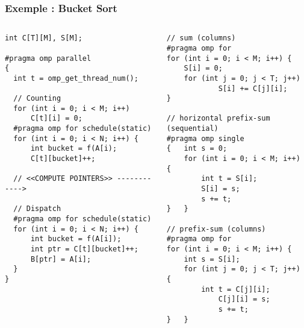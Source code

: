 \documentclass[xcolor={x11names,svgnames},x11names,svgnames]{beamer}
\begin{document}
\begin{frame}[label=radix_noconflict_table]
  \end{frame}


\begin{frame}[label=radix_code, fragile]
  \frametitle{Exemple : Bucket Sort}

  \begin{columns}
    \begin{column}{0.5\textwidth}
\begin{verbatim}
int C[T][M], S[M];

#pragma omp parallel
{
  int t = omp_get_thread_num();

  // Counting
  for (int i = 0; i < M; i++)
      C[t][i] = 0;
  #pragma omp for schedule(static)
  for (int i = 0; i < N; i++) {
      int bucket = f(A[i);
      C[t][bucket]++;

  // <<COMPUTE POINTERS>> ------------>

  // Dispatch
  #pragma omp for schedule(static)
  for (int i = 0; i < N; i++) {
      int bucket = f(A[i]);
      int ptr = C[t][bucket]++;
      B[ptr] = A[i];
  }
}
\end{verbatim}
    \end{column}  

    \begin{column}{5.8cm}
      \vspace{-0.7cm}
      \begin{verbatim}
// sum (columns)
#pragma omp for
for (int i = 0; i < M; i++) {
    S[i] = 0;
    for (int j = 0; j < T; j++)
            S[i] += C[j][i];
}

// horizontal prefix-sum (sequential)
#pragma omp single
{   int s = 0;
    for (int i = 0; i < M; i++) {
        int t = S[i];
        S[i] = s;
        s += t;
}   }

// prefix-sum (columns)
#pragma omp for
for (int i = 0; i < M; i++) {
    int s = S[i];
    for (int j = 0; j < T; j++) {
        int t = C[j][i];
            C[j][i] = s;
            s += t;
}   }
\end{verbatim}
    \end{column}
  \end{columns}
\end{frame}
\end{document}
